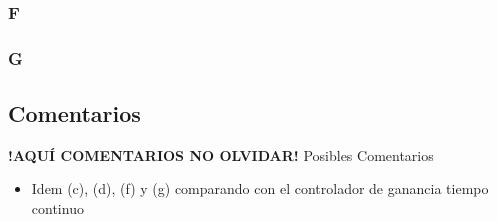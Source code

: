 \FloatBarrier
\subsubsection{F}%

\FloatBarrier
\subsubsection{G}%

\FloatBarrier
\subsection{Comentarios}


\textbf{!AQUÍ COMENTARIOS NO OLVIDAR!}
Posibles Comentarios
\begin{itemize}
    \item Idem (c), (d), (f) y (g) comparando con el controlador de ganancia tiempo continuo
\end{itemize}
